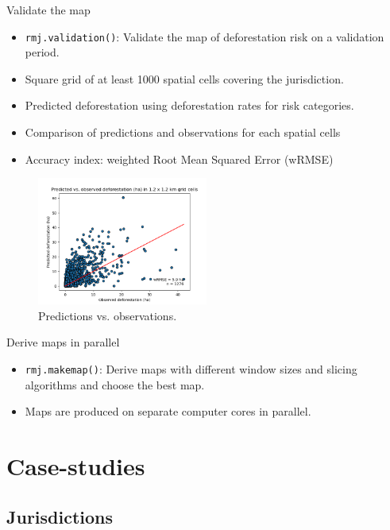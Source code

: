 \documentclass[10pt,table,dvipsnames,compress]{beamer}
\begin{document}
\begin{frame}[label={sec:org84beabf},fragile]{Validate the map}
 \begin{itemize}
\item \texttt{rmj.validation()}: Validate the map of deforestation risk on a validation period.
\item Square grid of at least 1000 spatial cells covering the jurisdiction.
\item Predicted deforestation using deforestation rates for risk categories.
\item Comparison of predictions and observations for each spatial cells
\item Accuracy index: weighted Root Mean Squared Error (wRMSE)
\end{itemize}

\begin{figure}[htbp]
\centering
\includegraphics[width=0.5\textwidth]{figs/pred_obs_ws5_ei.png}
\caption{\label{fig:orgca5fddd}Predictions vs. observations.}
\end{figure}
\end{frame}

\begin{frame}[label={sec:org95a7c49},fragile]{Derive maps in parallel}
 \begin{itemize}
\item \texttt{rmj.makemap()}: Derive maps with different window sizes and slicing algorithms and choose the best map.
\item Maps are produced on separate computer cores in parallel.
\end{itemize}
\end{frame}

\section{Case-studies}
\label{sec:org0af6bea}

\subsection{Jurisdictions}
\label{sec:orgf9fe58e}
\end{document}
